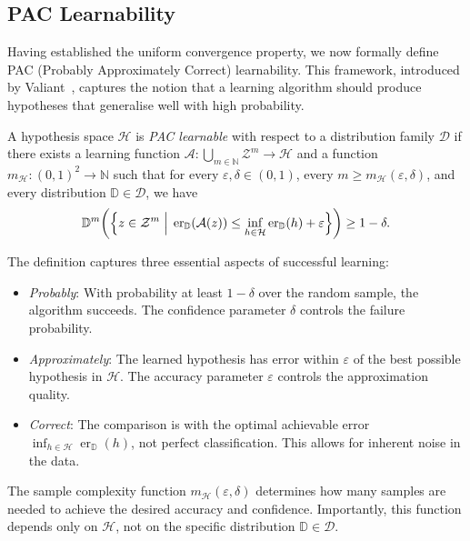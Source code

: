 \subsection{PAC Learnability}

Having established the uniform convergence property, we now formally define PAC (Probably Approximately Correct) learnability. This framework, introduced by Valiant~\cite{Valiant1984}, captures the notion that a learning algorithm should produce hypotheses that generalise well with high probability.

\begin{definition}
    \label{def:pac-learnable}
    A hypothesis space $\mathcal{H}$ is \emph{PAC learnable} with respect to a distribution family $\mathcal{D}$ if there exists a learning function $\mathcal{A}: \bigcup_{m \in \mathbb{N}} \mathcal{Z}^m \to \mathcal{H}$ and a function $m_{\mathcal{H}}: (0,1)^2 \to \mathbb{N}$ such that for every $\varepsilon, \delta \in (0,1)$, every $m \geq m_{\mathcal{H}}(\varepsilon, \delta)$, and every distribution $\mathbb{D} \in \mathcal{D}$, we have
    \[
        \mathbb{D}^m\!\left( \Bigl\{ z \in \mathcal{Z}^m \;\Big|\; \operatorname{er}_{\mathbb{D}}(\mathcal{A}(z)) \leq \inf_{h \in \mathcal{H}} \operatorname{er}_{\mathbb{D}}(h) + \varepsilon \Bigr\} \right) \geq 1-\delta.
    \]
\end{definition}

\begin{remarknl}
    
    The definition captures three essential aspects of successful learning:
    \begin{itemize}
        \item \emph{Probably}: With probability at least $1-\delta$ over the random sample, the algorithm succeeds. The confidence parameter $\delta$ controls the failure probability.
        \item \emph{Approximately}: The learned hypothesis has error within $\varepsilon$ of the best possible hypothesis in $\mathcal{H}$. The accuracy parameter $\varepsilon$ controls the approximation quality.
        \item \emph{Correct}: The comparison is with the optimal achievable error $\inf_{h \in \mathcal{H}} \operatorname{er}_{\mathbb{D}}(h)$, not perfect classification. This allows for inherent noise in the data.
    \end{itemize}
    
    The sample complexity function $m_{\mathcal{H}}(\varepsilon, \delta)$ determines how many samples are needed to achieve the desired accuracy and confidence. Importantly, this function depends only on $\mathcal{H}$, not on the specific distribution $\mathbb{D} \in \mathcal{D}$.
\end{remarknl}

